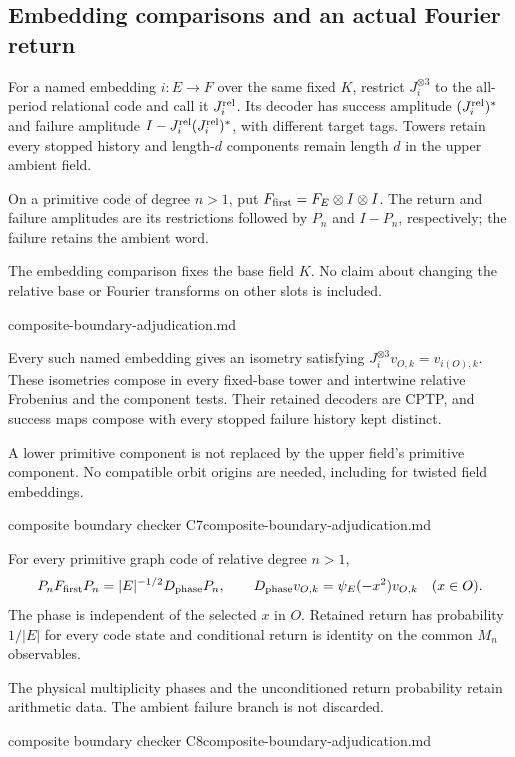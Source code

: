 \subsection{Embedding comparisons and an actual Fourier return}

\begin{definition}
For a named embedding $i:E\to F$ over the same fixed $K$, restrict
$J_i^{\otimes3}$ to the all-period relational code and call it
$J_i^{\rm rel}$. Its decoder has success amplitude $(J_i^{\rm rel})^*$
and failure amplitude $I-J_i^{\rm rel}(J_i^{\rm rel})^*$, with different
target tags. Towers retain every stopped history and length-$d$ components
remain length $d$ in the upper ambient field.

On a primitive code of degree $n>1$, put $F_{\rm first}=F_E\otimes I\otimes I$.
The return and failure amplitudes are its restrictions followed by $P_n$
and $I-P_n$, respectively; the failure retains the ambient word.
\end{definition}
\begin{scope}
The embedding comparison fixes the base field $K$. No claim about changing
the relative base or Fourier transforms on other slots is included.
\end{scope}
{composite-boundary-adjudication.md}

\begin{proposition}
\statusProved\quad
Every such named embedding gives an isometry satisfying
$J_i^{\otimes3}v_{O,k}=v_{i(O),k}$. These isometries compose in every
fixed-base tower and intertwine relative Frobenius and the component tests.
Their retained decoders are CPTP, and success maps compose with every
stopped failure history kept distinct.
\end{proposition}
\begin{scope}
A lower primitive component is not replaced by the upper field's
primitive component. No compatible orbit origins are needed, including
for twisted field embeddings.
\end{scope}
{composite boundary checker C7}{composite-boundary-adjudication.md}

\begin{proposition}
\statusProved\quad
For every primitive graph code of relative degree $n>1$,
\[
 P_nF_{\rm first}P_n=|E|^{-1/2}D_{\rm phase}P_n,\qquad
 D_{\rm phase}v_{O,k}=\psi_E(-x^2)v_{O,k}\quad(x\in O).
\]
The phase is independent of the selected $x$ in $O$. Retained return has
probability $1/|E|$ for every code state and conditional return is identity
on the common $M_n$ observables.
\end{proposition}
\begin{scope}
The physical multiplicity phases and the unconditioned return probability
retain arithmetic data. The ambient failure branch is not discarded.
\end{scope}
{composite boundary checker C8}{composite-boundary-adjudication.md}

